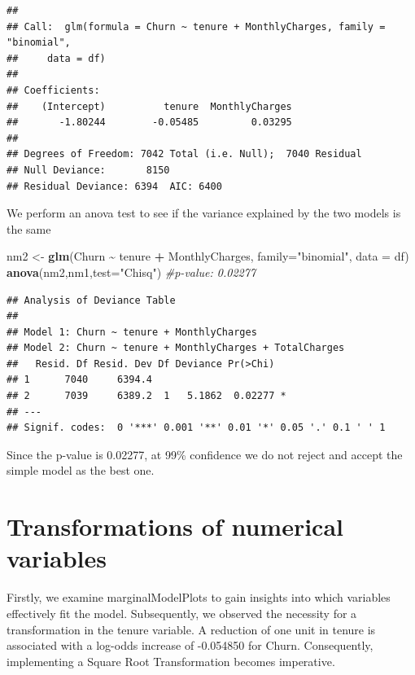 \documentclass[
]{article}
\newenvironment{Shaded}{\begin{snugshade}}{\end{snugshade}}
\newcommand{\AttributeTok}[1]{\textcolor[rgb]{0.13,0.29,0.53}{#1}}
\newcommand{\CommentTok}[1]{\textcolor[rgb]{0.56,0.35,0.01}{\textit{#1}}}
\newcommand{\FunctionTok}[1]{\textcolor[rgb]{0.13,0.29,0.53}{\textbf{#1}}}
\newcommand{\NormalTok}[1]{#1}
\newcommand{\OtherTok}[1]{\textcolor[rgb]{0.56,0.35,0.01}{#1}}
\newcommand{\SpecialCharTok}[1]{\textcolor[rgb]{0.81,0.36,0.00}{\textbf{#1}}}
\newcommand{\StringTok}[1]{\textcolor[rgb]{0.31,0.60,0.02}{#1}}
\begin{document}
\begin{verbatim}
## 
## Call:  glm(formula = Churn ~ tenure + MonthlyCharges, family = "binomial", 
##     data = df)
## 
## Coefficients:
##    (Intercept)          tenure  MonthlyCharges  
##       -1.80244        -0.05485         0.03295  
## 
## Degrees of Freedom: 7042 Total (i.e. Null);  7040 Residual
## Null Deviance:       8150 
## Residual Deviance: 6394  AIC: 6400
\end{verbatim}

We perform an anova test to see if the variance explained by the two
models is the same

\begin{Shaded}
\begin{Highlighting}[]
\NormalTok{nm2 }\OtherTok{\textless{}{-}} \FunctionTok{glm}\NormalTok{(Churn }\SpecialCharTok{\textasciitilde{}}\NormalTok{ tenure }\SpecialCharTok{+}\NormalTok{ MonthlyCharges, }\AttributeTok{family=}\StringTok{"binomial"}\NormalTok{, }\AttributeTok{data =}\NormalTok{ df)}
\FunctionTok{anova}\NormalTok{(nm2,nm1,}\AttributeTok{test=}\StringTok{"Chisq"}\NormalTok{) }\CommentTok{\#p{-}value: 0.02277 }
\end{Highlighting}
\end{Shaded}

\begin{verbatim}
## Analysis of Deviance Table
## 
## Model 1: Churn ~ tenure + MonthlyCharges
## Model 2: Churn ~ tenure + MonthlyCharges + TotalCharges
##   Resid. Df Resid. Dev Df Deviance Pr(>Chi)  
## 1      7040     6394.4                       
## 2      7039     6389.2  1   5.1862  0.02277 *
## ---
## Signif. codes:  0 '***' 0.001 '**' 0.01 '*' 0.05 '.' 0.1 ' ' 1
\end{verbatim}

Since the p-value is 0.02277, at 99\% confidence we do not reject and
accept the simple model as the best one.

\hypertarget{transformations-of-numerical-variables}{%
\section{Transformations of numerical
variables}\label{transformations-of-numerical-variables}}

Firstly, we examine marginalModelPlots to gain insights into which
variables effectively fit the model. Subsequently, we observed the
necessity for a transformation in the tenure variable. A reduction of
one unit in tenure is associated with a log-odds increase of -0.054850
for Churn. Consequently, implementing a Square Root Transformation
becomes imperative.
\end{document}
